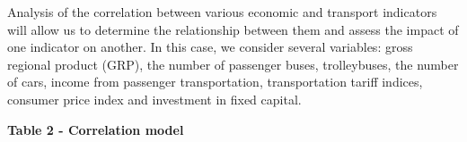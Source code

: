 
Analysis of the correlation between various economic and transport
indicators will allow us to determine the relationship between them and
assess the impact of one indicator on another. In this case, we consider
several variables: gross regional product (GRP), the number of passenger
buses, trolleybuses, the number of cars, income from passenger
transportation, transportation tariff indices, consumer price index and
investment in fixed capital.

{\bfseries Table 2 - Correlation model}

